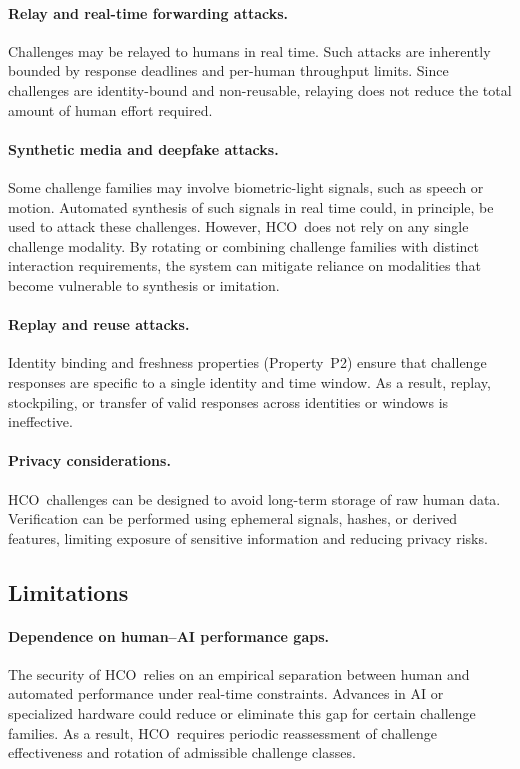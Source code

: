 \documentclass[11pt]{article}
\newcommand{\HCO}{HCO\xspace}
\begin{document}
\paragraph{Relay and real-time forwarding attacks.}
Challenges may be relayed to humans in real time. Such attacks are inherently bounded by response deadlines and per-human throughput limits. Since challenges are identity-bound and non-reusable, relaying does not reduce the total amount of human effort required.

\paragraph{Synthetic media and deepfake attacks.}
Some challenge families may involve biometric-light signals, such as speech or motion. Automated synthesis of such signals in real time could, in principle, be used to attack these challenges. However, \HCO\ does not rely on any single challenge modality. By rotating or combining challenge families with distinct interaction requirements, the system can mitigate reliance on modalities that become vulnerable to synthesis or imitation.

\paragraph{Replay and reuse attacks.}
Identity binding and freshness properties (Property~P2) ensure that challenge responses are specific to a single identity and time window. As a result, replay, stockpiling, or transfer of valid responses across identities or windows is ineffective.

\paragraph{Privacy considerations.}
\HCO\ challenges can be designed to avoid long-term storage of raw human data. Verification can be performed using ephemeral signals, hashes, or derived features, limiting exposure of sensitive information and reducing privacy risks.

\subsection{Limitations}

\paragraph{Dependence on human--AI performance gaps.}
The security of \HCO\ relies on an empirical separation between human and automated performance under real-time constraints. Advances in AI or specialized hardware could reduce or eliminate this gap for certain challenge families. As a result, \HCO\ requires periodic reassessment of challenge effectiveness and rotation of admissible challenge classes.
\end{document}
